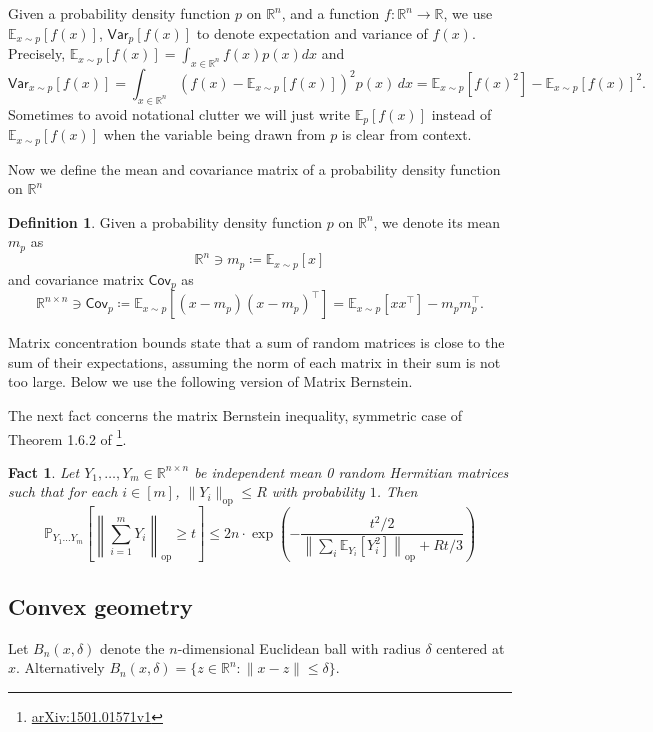 \documentclass[11pt]{article}
\numberwithin{equation}{section}
\newtheorem{fact}[fact]{Fact}
\theoremstyle{definition}
\newtheorem{definition}[definition]{Definition}
\newcommand{\R}{\mathbb{R}}
\newcommand{\E}[2]{\mathbb{E}_{#1}\left[#2\right]}
\renewcommand{\P}[2]{\mathbb{P}_{#1}\left[#2\right]}
\newcommand{\V}[2]{\mathsf{Var}_{#1}\left[#2\right]}
\newcommand{\C}{\mathsf{Cov}}
\newcommand{\norm}[1]{\left\lVert#1\right\rVert}
\newcommand{\op}{\mathrm{op}}
\begin{document}
Given a probability density function $p$ on
$\R^{n}$, and a function
$f: \R^{n} \rightarrow \R$, we use
$\E{x \sim p}{f(x)}$,
$\V{p}{f(x)}$ to denote expectation and variance of
$f(x)$.
Precisely, $\E{x \sim p}{f(x)} = \int_{x \in \R^{n}} f(x) p(x) dx$ and
\[
\V{x \sim p}{f\left(x\right)}
= \int_{x \in \R^{n}} \left(f\left(x\right) - \E{x \sim p}{f\left(x\right)}\right)^2 p\left(x\right)\,dx
= \E{x \sim p}{f\left(x\right)^2} - \E{x \sim p}{f\left(x\right)}^2.
\]
Sometimes to avoid notational clutter we will just write $\E{p}{f(x)}$ instead
of
$\E{x \sim p}{f(x)}$ when the variable being drawn from
$p$ is clear from context.

Now we define the mean and covariance matrix of a probability density function
on $\R^n$

\begin{definition}
\label{def:cov}
Given a probability density function $p$ on
$\R^n$, we denote its mean
$m_p$ as
\[
\R^n \ni m_p
\coloneq
\E{x \sim p}{x}
\]
and covariance matrix $\C_p$ as
\[
\R^{n \times n} \ni \C_p
\coloneq \E{x \sim p}{\left(x-m_p\right)\left(x-m_p\right)^\top}
= \E{x \sim p}{xx^\top} - m_pm_p^\top.
\]
\end{definition}

Matrix concentration bounds state that a sum of random matrices is close to the
sum of their expectations, assuming the norm of each matrix in their sum is not
too large.
Below we use the following version of Matrix Bernstein.

The next fact concerns the matrix Bernstein inequality, symmetric case of
Theorem 1.6.2 of \cite{T15:journal}
\footnote{\href{https://arxiv.org/pdf/1501.01571v1}{arXiv:1501.01571v1}}.

\begin{fact}
\label{prelim:mat_bern}
Let $Y_1, \dots, Y_m \in \R^{n \times n}$ be independent mean 0 random Hermitian
matrices such that for each
$i \in [m]$,
$\|Y_i\|_{\op} \leq R$ with probability
$1$.
Then
\[
\P{Y_1 \ldots Y_m}{\norm{\sum_{i = 1}^{m} Y_i}_{\op} \geq t}
\leq
2n \cdot \exp\left(
-\frac{t^2/2}{\norm{ \sum_{i}\E{Y_i}{Y_i^2}}_{\op}  + Rt/3}
\right)
\]
\end{fact}

\subsection{Convex geometry}

Let $B_n(x, \delta)$ denote the
$n$-dimensional Euclidean ball with radius
$\delta$ centered at
$x$.
Alternatively $B_n(x, \delta) = \{z \in \R^n : \|x-z\| \leq \delta\}$.
\end{document}
